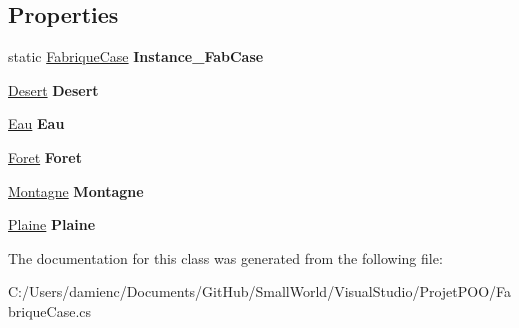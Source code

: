 \subsection*{Properties}
\begin{DoxyCompactItemize}
\item 
\hypertarget{class_small_world_1_1_fabrique_case_a96990312ee03173a457a9140b5302261}{static \hyperlink{class_small_world_1_1_fabrique_case}{Fabrique\-Case} {\bfseries Instance\-\_\-\-Fab\-Case}}\label{class_small_world_1_1_fabrique_case_a96990312ee03173a457a9140b5302261}

\item 
\hypertarget{class_small_world_1_1_fabrique_case_a960d80498fb7512f1bc57e30b900b958}{\hyperlink{class_small_world_1_1_desert}{Desert} {\bfseries Desert}}\label{class_small_world_1_1_fabrique_case_a960d80498fb7512f1bc57e30b900b958}

\item 
\hypertarget{class_small_world_1_1_fabrique_case_aa247bfdc40a15c5738d48d55e56ad169}{\hyperlink{class_small_world_1_1_eau}{Eau} {\bfseries Eau}}\label{class_small_world_1_1_fabrique_case_aa247bfdc40a15c5738d48d55e56ad169}

\item 
\hypertarget{class_small_world_1_1_fabrique_case_a800e3f658e67dcd6ab269386ed08dc2f}{\hyperlink{class_small_world_1_1_foret}{Foret} {\bfseries Foret}}\label{class_small_world_1_1_fabrique_case_a800e3f658e67dcd6ab269386ed08dc2f}

\item 
\hypertarget{class_small_world_1_1_fabrique_case_a6b633850fecde0d1a9a42b65eb73b248}{\hyperlink{class_small_world_1_1_montagne}{Montagne} {\bfseries Montagne}}\label{class_small_world_1_1_fabrique_case_a6b633850fecde0d1a9a42b65eb73b248}

\item 
\hypertarget{class_small_world_1_1_fabrique_case_a97131f6c0a1bc3ceeedf98059fbba0c1}{\hyperlink{class_small_world_1_1_plaine}{Plaine} {\bfseries Plaine}}\label{class_small_world_1_1_fabrique_case_a97131f6c0a1bc3ceeedf98059fbba0c1}

\end{DoxyCompactItemize}


The documentation for this class was generated from the following file\-:\begin{DoxyCompactItemize}
\item 
C\-:/\-Users/damienc/\-Documents/\-Git\-Hub/\-Small\-World/\-Visual\-Studio/\-Projet\-P\-O\-O/Fabrique\-Case.\-cs\end{DoxyCompactItemize}
